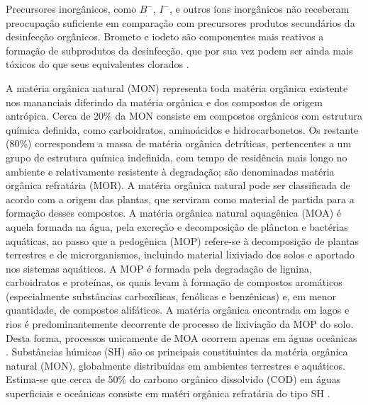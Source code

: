 Precursores inorgânicos, como  \begin{math} B^-\end{math}, \begin{math}  I^- \end{math}, e outros íons inorgânicos não receberam preocupação suficiente em comparação com precursores produtos secundários da desinfecção orgânicos. Brometo e iodeto são componentes mais reativos a formação de subprodutos da desinfecção, que por sua vez podem ser ainda mais tóxicos do que seus equivalentes clorados \cite{Krasner2006,zhao2016effects}. 

A matéria orgânica natural (MON) representa toda matéria orgânica existente nos mananciais diferindo da matéria orgânica e dos compostos de origem antrópica. Cerca de 20\% da MON consiste em compostos orgânicos com estrutura química definida, como carboidratos, aminoácidos e hidrocarbonetos. Os restante (80\%) correspondem a massa de matéria orgânica detríticas, pertencentes a um grupo de estrutura química indefinida, com tempo de residência mais longo no ambiente e relativamente resistente à degradação; são denominadas matéria orgânica refratária (MOR). A matéria orgânica natural pode ser classificada de acordo com a origem das plantas, que serviram como material de partida para a formação desses compostos. A matéria orgânica natural aquagênica (MOA) é aquela formada na água, pela excreção e decomposição de plâncton e bactérias aquáticas, ao passo que a pedogênica (MOP) refere-se à decomposição de plantas terrestres e de microrganismos, incluindo material lixiviado dos solos e aportado nos sistemas aquáticos.
A MOP é formada pela degradação de lignina, carboidratos e proteínas, os quais levam à formação de compostos aromáticos (especialmente substâncias carboxílicas, fenólicas e benzênicas) e, em menor quantidade, de compostos alifáticos. A matéria orgânica encontrada em lagos e rios é predominantemente decorrente de processo de lixiviação da MOP do solo. Desta forma, processos unicamente de MOA ocorrem apenas em águas oceânicas \cite{rocha2009}. Substâncias húmicas (SH) são os principais constituintes da matéria orgânica natural (MON), globalmente distribuídas em ambientes terrestres e aquáticos. Estima-se que cerca de 50\% do carbono orgânico dissolvido (COD) em águas superficiais e oceânicas consiste em matéri orgânica refratária do tipo SH \cite{swietlik2004reactivity, rocha2009}.

